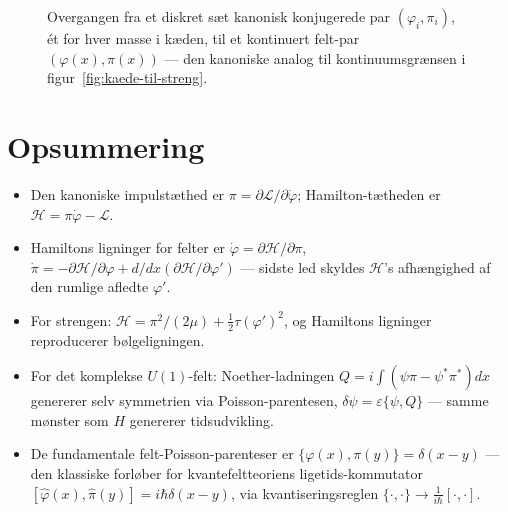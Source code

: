 \begin{figure}[htbp]
  \centering
  \caption{Overgangen fra et diskret sæt kanonisk konjugerede par
  $(\varphi_i,\pi_i)$, ét for hver masse i kæden, til et kontinuert
  felt-par $(\varphi(x),\pi(x))$ — den kanoniske analog til
  kontinuumsgrænsen i figur~\ref{fig:kaede-til-streng}.}
  \label{fig:felt-poisson}
\end{figure}

\section{Opsummering}

\begin{itemize}
  \item Den kanoniske impulstæthed er $\pi=\partial\mathcal{L}/\partial\dot\varphi$;
        Hamilton-tætheden er $\mathcal{H}=\pi\dot\varphi-\mathcal{L}$.
  \item Hamiltons ligninger for felter er
        $\dot\varphi=\partial\mathcal{H}/\partial\pi$,
        $\dot\pi=-\partial\mathcal{H}/\partial\varphi + d/dx(\partial\mathcal{H}/\partial\varphi')$
        — sidste led skyldes $\mathcal{H}$'s afhængighed af den
        rumlige afledte $\varphi'$.
  \item For strengen: $\mathcal{H}=\pi^2/(2\mu)+\frac12\tau(\varphi')^2$,
        og Hamiltons ligninger reproducerer bølgeligningen.
  \item For det komplekse $U(1)$-felt: Noether-ladningen
        $Q=i\int(\psi\pi-\psi^\ast\pi^\ast)dx$ genererer selv symmetrien
        via Poisson-parentesen, $\delta\psi=\varepsilon\{\psi,Q\}$ —
        samme mønster som $H$ genererer tidsudvikling.
  \item De fundamentale felt-Poisson-parenteser er
        $\{\varphi(x),\pi(y)\}=\delta(x-y)$ — den klassiske forløber
        for kvantefeltteoriens ligetids-kommutator
        $[\hat\varphi(x),\hat\pi(y)]=i\hbar\delta(x-y)$, via
        kvantiseringsreglen $\{\cdot,\cdot\}\to\frac{1}{i\hbar}[\cdot,\cdot]$.
\end{itemize}

